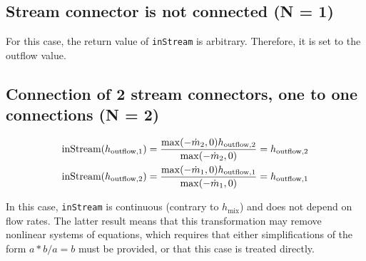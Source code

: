 \subsection{Stream connector is not connected (N = 1)}\label{stream-connector-is-not-connected-n-1}
For this case, the return value of \lstinline!inStream! is arbitrary.
Therefore, it is set to the outflow value.

\subsection{Connection of 2 stream connectors, one to one connections (N = 2)}\label{connection-of-2-stream-connectors-one-to-one-connections-n-2}

\begin{align*}
\text{\lstinline!inStream!}(h_{\mathrm{outflow},1}) &= \frac{\operatorname{max}(-\dot{m}_2,0)h_{\mathrm{outflow},2}}{\operatorname{max}(-\dot{m}_2,0)}=h_{\mathrm{outflow},2}\\
\text{\lstinline!inStream!}(h_{\mathrm{outflow},2}) &= \frac{\operatorname{max}(-\dot{m}_1,0)h_{\mathrm{outflow},1}}{\operatorname{max}(-\dot{m}_1,0)}=h_{\mathrm{outflow},1}
\end{align*}

In this case, \lstinline!inStream! is continuous (contrary to $h_{\mathrm{mix}}$) and does not
depend on flow rates. The latter result means that this transformation
may remove nonlinear systems of equations, which requires that either
simplifications of the form $a * b / a = b$ must be provided, or that this
case is treated directly.

